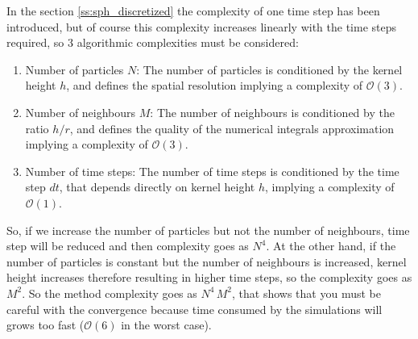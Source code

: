 %
In the section \ref{ss:sph_discretized} the complexity of one time step has been introduced, but of
course this complexity increases linearly with the time steps required, so 3 algorithmic complexities
must be considered:
%
\begin{enumerate}
	\item Number of particles $N$: The number of particles is conditioned by the kernel height $h$,
	and defines the spatial resolution implying a complexity of $\mathcal{O}(3)$.
	\item Number of neighbours $M$: The number of neighbours is conditioned by the ratio $h / r$, and
	defines the quality of the numerical integrals approximation implying a complexity of
	$\mathcal{O}(3)$.
	\item Number of time steps: The number of time steps is conditioned by the time step $dt$, that
	depends directly on kernel height $h$, implying a complexity of $\mathcal{O}(1)$.
\end{enumerate}
%
So, if we increase the number of particles but not the number of neighbours, time step will be reduced
and then complexity goes as $N^4$.\rc
%
At the other hand, if the number of particles is constant but the number of neighbours is increased,
kernel height increases therefore resulting in higher time steps, so the complexity goes as $M^2$.\rc
%
So the method complexity goes as $N^4 \, M^2$, that shows that you must be careful with the convergence
because time consumed by the simulations will grows too fast ($\mathcal{O}(6)$ in the worst case).
%
